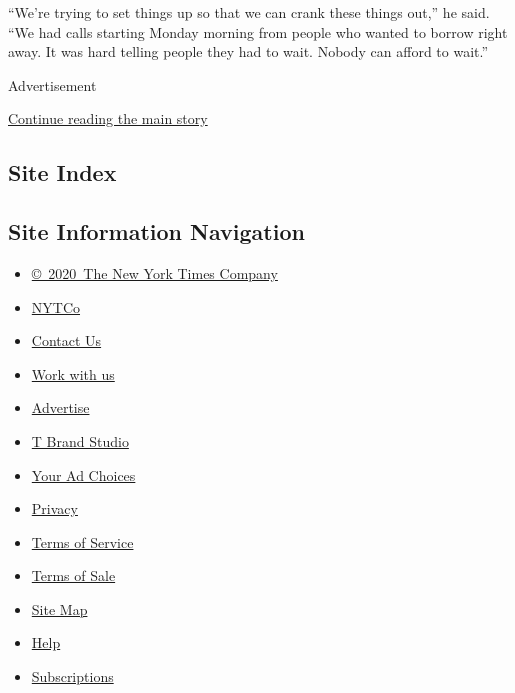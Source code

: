 ``We're trying to set things up so that we can crank these things out,''
he said. ``We had calls starting Monday morning from people who wanted
to borrow right away. It was hard telling people they had to wait.
Nobody can afford to wait.''

Advertisement

\protect\hyperlink{after-bottom}{Continue reading the main story}

\hypertarget{site-index}{%
\subsection{Site Index}\label{site-index}}

\hypertarget{site-information-navigation}{%
\subsection{Site Information
Navigation}\label{site-information-navigation}}

\begin{itemize}
\tightlist
\item
  \href{https://help.nytimes.com/hc/en-us/articles/115014792127-Copyright-notice}{©~2020~The
  New York Times Company}
\end{itemize}

\begin{itemize}
\tightlist
\item
  \href{https://www.nytco.com/}{NYTCo}
\item
  \href{https://help.nytimes.com/hc/en-us/articles/115015385887-Contact-Us}{Contact
  Us}
\item
  \href{https://www.nytco.com/careers/}{Work with us}
\item
  \href{https://nytmediakit.com/}{Advertise}
\item
  \href{http://www.tbrandstudio.com/}{T Brand Studio}
\item
  \href{https://www.nytimes.com/privacy/cookie-policy\#how-do-i-manage-trackers}{Your
  Ad Choices}
\item
  \href{https://www.nytimes.com/privacy}{Privacy}
\item
  \href{https://help.nytimes.com/hc/en-us/articles/115014893428-Terms-of-service}{Terms
  of Service}
\item
  \href{https://help.nytimes.com/hc/en-us/articles/115014893968-Terms-of-sale}{Terms
  of Sale}
\item
  \href{https://spiderbites.nytimes.com}{Site Map}
\item
  \href{https://help.nytimes.com/hc/en-us}{Help}
\item
  \href{https://www.nytimes.com/subscription?campaignId=37WXW}{Subscriptions}
\end{itemize}
